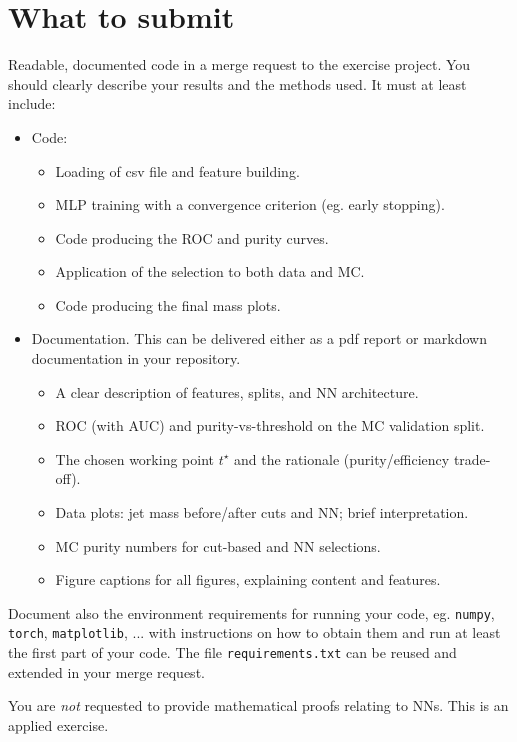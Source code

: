 \documentclass[11pt]{article}
\begin{document}
\section*{What to submit}
Readable, documented code in a merge request to the exercise project. You should clearly describe your results and the methods used. It must at least include:
\begin{itemize}
      \item Code:
      \begin{itemize}
        \item Loading of csv file and feature building.
        \item MLP training with a convergence criterion (eg. early stopping).
        \item Code producing the ROC and purity curves.
        \item Application of the selection to both data and MC.
        \item Code producing the final mass plots.
      \end{itemize}
      \item Documentation. This can be delivered either as a pdf report or markdown documentation in your repository.
      \begin{itemize}
        \item A clear description of features, splits, and NN architecture.
        \item ROC (with AUC) and purity-vs-threshold on the MC validation split.
        \item The chosen working point $t^\star$ and the rationale (purity/efficiency trade-off).
        \item Data plots: jet mass before/after cuts and NN; brief interpretation.
        \item MC purity numbers for cut-based and NN selections.
        \item Figure captions for all figures, explaining content and features.
    \end{itemize}
\end{itemize}
Document also the environment requirements for running your code, eg. \texttt{numpy}, \texttt{torch}, \texttt{matplotlib}, ... with instructions on how to obtain them and run at least the first part of your code. The file \texttt{requirements.txt} can be reused and extended in your merge request.

You are \emph{not} requested to provide mathematical proofs relating to NNs. This is an applied exercise.
\end{document}
